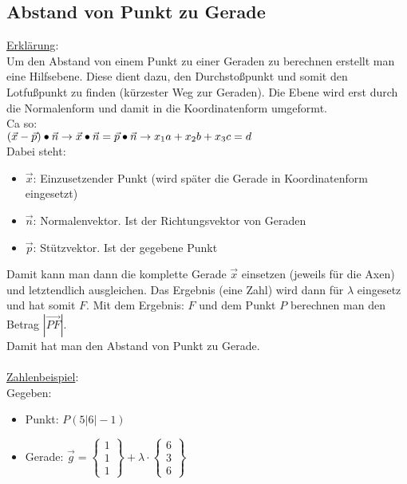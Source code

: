 \subsection{Abstand von Punkt zu Gerade}
\underline{Erklärung}: \\
Um den Abstand von einem Punkt zu einer Geraden zu berechnen erstellt man eine Hilfsebene.
Diese dient dazu, den Durchstoßpunkt und somit den Lotfußpunkt zu finden (kürzester Weg zur Geraden). 
Die Ebene wird erst durch die Normalenform und damit in die Koordinatenform umgeformt. \\
Ca so: \\
$
(\vec{x} - \vec{p}) \bullet \vec{n} \\
\rightarrow \vec{x} \bullet \vec{n} = \vec{p} \bullet \vec{n} \\
\rightarrow x_1a + x_2b + x_3c = d
$
\\
Dabei steht: 
\begin{itemize}
    \item $\vec{x}$: Einzusetzender Punkt (wird später die Gerade in Koordinatenform eingesetzt)
    \item $\vec{n}$: Normalenvektor. Ist der Richtungsvektor von Geraden 
    \item $\vec{p}$: Stützvektor. Ist der gegebene Punkt
\end{itemize}
Damit kann man dann die komplette Gerade $\vec{x}$ einsetzen 
(jeweils für die Axen) und letztendlich ausgleichen. 
Das Ergebnis (eine Zahl) wird dann für $\lambda$ eingesetz und hat somit $F$.
Mit dem Ergebnis: $F$ und dem Punkt $P$ berechnen man den Betrag $|\overrightarrow{PF}|$. \\
Damit hat man den Abstand von Punkt zu Gerade.
\\\\
\underline{Zahlenbeispiel}: \\
Gegeben: 
\begin{itemize}
    \item Punkt: $P(5|6|-1)$
    \item Gerade: $
        \vec{g} = 
        \begin{Bmatrix}
            1 \\ 1 \\ 1
        \end{Bmatrix}
        + \lambda \cdot
        \begin{Bmatrix}
            6 \\ 3 \\ 6
        \end{Bmatrix}
        $
\end{itemize}
